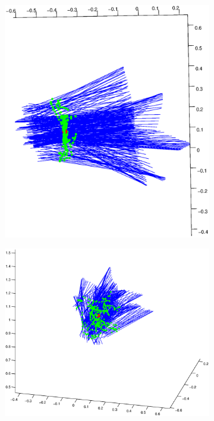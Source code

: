 \begin{figure}[h]
	\centering
	\begin{subfigure}[b]{0.49\textwidth}
		\includegraphics[width=1.1\linewidth]{./img/loc_calib_gauss.eps}
	\end{subfigure}
	\hfill
	\begin{subfigure}[b]{0.49\textwidth}
		\includegraphics[width=1.1\linewidth]{./img/loc_calib_gauss_cross.eps}

\end{subfigure}
\end{figure}
